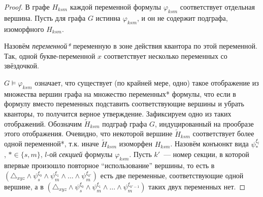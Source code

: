 \begin{proof}
В графе $H_{ksm}$ каждой переменной формулы $\varphi_{ksm}$ соответствует отдельная вершина.
Пусть для графа $G$ истинна $\varphi_{ksm}$, и он не содержит подграфа, изоморфного $H_{ksm}$.

Назовём \textit{переменной*} переменную в зоне действия квантора по этой переменной.
Так, одной букве-переменной $x$ соответствует несколько переменных со звёздочкой.

$G \vDash \varphi_{ksm}$
означает, что существует (по крайней мере, одно) такое отображение из множества вершин графа на множество переменных* формулы, что если в формулу вместо переменных подставить соответствующие вершины и убрать кванторы, то получится верное утверждение.
Зафиксируем одно из таких отображений.
Обозначим $\tilde H_{ksm}$ подграф графа $G$, индуцированный на прообразе этого отображения.
Очевидно, что некоторой вершине $\tilde H_{ksm}$ соответствует более одной переменной*, т.к.  иначе $\tilde H_{ksm}$ изоморфен $H_{ksm}$.
Назовём конъюнкт вида $\psi^{\xi_l}_*$, $* \in \{s, m \}$, $l$-ой \textit{секцией} формулы $\varphi_{ksm}$.
Пусть $k'$~--- номер секции, в которой впервые произошло повторное ``использование'' вершины, то есть в $(\triangle_{xyz} \wedge \psi_{s}^{\xi_0} \wedge \psi_{m}^{\xi_1} \wedge \ldots \wedge \psi_{m}^{\xi_{k'}})$ есть две переменные, соответствующие одной вершине, а в $(\triangle_{xyz} \wedge \psi_{s}^{\xi_0} \wedge \psi_{m}^{\xi_1} \wedge \ldots \wedge \psi_{m}^{\xi_{k'-1}})$ таких двух переменных нет.


\end{proof}
